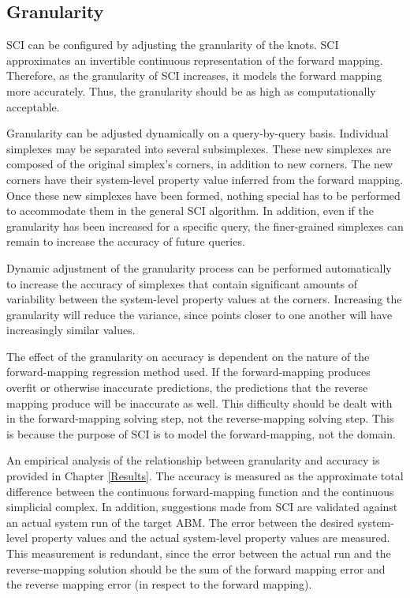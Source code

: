 \subsection{Granularity}
\label{subsec:granularity}

SCI can be configured by adjusting the granularity of the knots.
SCI approximates an invertible continuous representation of the forward mapping.
Therefore, as the granularity of SCI increases, it models the forward mapping more accurately.
Thus, the granularity should be as high as computationally acceptable.

Granularity can be adjusted dynamically on a query-by-query basis.
Individual simplexes may be separated into several subsimplexes.
These new simplexes are composed of the original simplex's corners, in addition to new corners.
The new corners have their system-level property value inferred from the forward mapping.
Once these new simplexes have been formed, nothing special has to be performed to accommodate them in the general SCI algorithm.
In addition, even if the granularity has been increased for a specific query, the finer-grained simplexes can remain to increase the accuracy of future queries.

Dynamic adjustment of the granularity process can be performed automatically to increase the accuracy of simplexes that contain significant amounts of variability between the system-level property values at the corners.
Increasing the granularity will reduce the variance, since points closer to one another will have increasingly similar values.

The effect of the granularity on accuracy is dependent on the nature of the forward-mapping regression method used.
If the forward-mapping produces overfit or otherwise inaccurate predictions, the predictions that the reverse mapping produce will be inaccurate as well.
This difficulty should be dealt with in the forward-mapping solving step, not the reverse-mapping solving step.
This is because the purpose of SCI is to model the forward-mapping, not the domain.

An empirical analysis of the relationship between granularity and accuracy is provided in Chapter \ref{Results}.
The accuracy is measured as the approximate total difference between the continuous forward-mapping function and the continuous simplicial complex.
In addition, suggestions made from SCI are validated against an actual system run of the target ABM.
The error between the desired system-level property values and the actual system-level property values are measured.
This measurement is redundant, since the error between the actual run and the reverse-mapping solution should be the sum of the forward mapping error and the reverse mapping error (in respect to the forward mapping).



